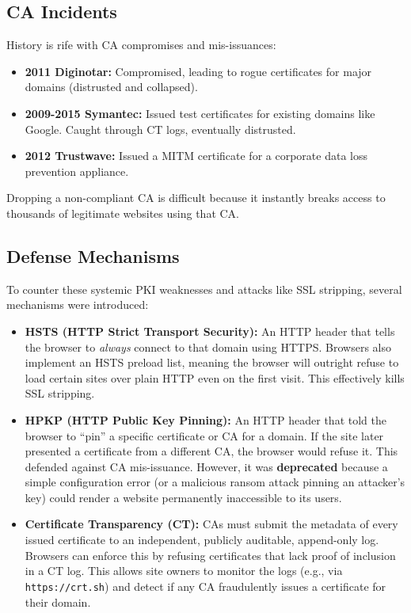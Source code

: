 \subsection{CA Incidents}
History is rife with CA compromises and mis-issuances:
\begin{itemize}
    \item \textbf{2011 Diginotar:} Compromised, leading to rogue certificates for major domains (distrusted and collapsed).
    \item \textbf{2009-2015 Symantec:} Issued test certificates for existing domains like Google. Caught through CT logs, eventually distrusted.
    \item \textbf{2012 Trustwave:} Issued a MITM certificate for a corporate data loss prevention appliance.
\end{itemize}
Dropping a non-compliant CA is difficult because it instantly breaks access to thousands of legitimate websites using that CA.

\subsection{Defense Mechanisms}
To counter these systemic PKI weaknesses and attacks like SSL stripping, several mechanisms were introduced:

\begin{itemize}
    \item \textbf{HSTS (HTTP Strict Transport Security):} An HTTP header that tells the browser to \textit{always} connect to that domain using HTTPS. Browsers also implement an HSTS preload list, meaning the browser will outright refuse to load certain sites over plain HTTP even on the first visit. This effectively kills SSL stripping.
    \item \textbf{HPKP (HTTP Public Key Pinning):} An HTTP header that told the browser to ``pin'' a specific certificate or CA for a domain. If the site later presented a certificate from a different CA, the browser would refuse it. This defended against CA mis-issuance. However, it was \textbf{deprecated} because a simple configuration error (or a malicious ransom attack pinning an attacker's key) could render a website permanently inaccessible to its users.
    \item \textbf{Certificate Transparency (CT):} CAs must submit the metadata of every issued certificate to an independent, publicly auditable, append-only log. Browsers can enforce this by refusing certificates that lack proof of inclusion in a CT log. This allows site owners to monitor the logs (e.g., via \texttt{https://crt.sh}) and detect if any CA fraudulently issues a certificate for their domain.
\end{itemize}

